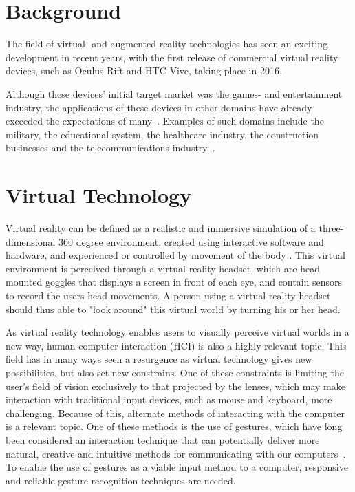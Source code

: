 \section{Background}            
The field of virtual- and augmented reality technologies has seen an exciting development in recent years, 
with the first release of commercial virtual reality devices, such as Oculus Rift and HTC Vive, taking place in 2016.



Although these devices' initial target market was the games- and entertainment industry, 
the applications of these devices in other domains have already exceeded the expectations of many~\citep{VRS2016}. 
Examples of such domains include the military, the educational system, the healthcare industry, the construction businesses and the telecommunications industry~\citep{VRS2016}. 

\section{Virtual Technology}
Virtual reality can be defined as a realistic and immersive simulation of a three-dimensional 360 degree environment, 
created using interactive software and hardware, and experienced or controlled by movement of the body \citep{VRS2016}.
This virtual environment is perceived through a virtual reality headset, which are head mounted goggles that displays a screen in front of each eye, and contain sensors to 
record the users head movements. A person using a virtual reality headset should thus able to "look around" this virtual world by turning his or her head.






As virtual reality technology enables users to visually perceive virtual worlds in a new way, 
human-computer interaction (HCI) is also a highly relevant topic. 
This field has in many ways seen a resurgence as virtual technology gives new possibilities, but also set new constrains. 
One of these constraints is limiting the user's field of vision exclusively to that projected by the lenses, 
which may make interaction with traditional input devices, such as mouse and keyboard, more challenging. 
Because of this, alternate methods of interacting with the computer is a relevant topic. 
One of these methods is the use of gestures, 
which have long been considered an interaction technique that can potentially deliver more natural, 
creative and intuitive methods for communicating with our computers~\citep{Rautaray2015}. 
To enable the use of gestures as a viable input method to a computer, responsive and reliable gesture recognition techniques are needed.  

